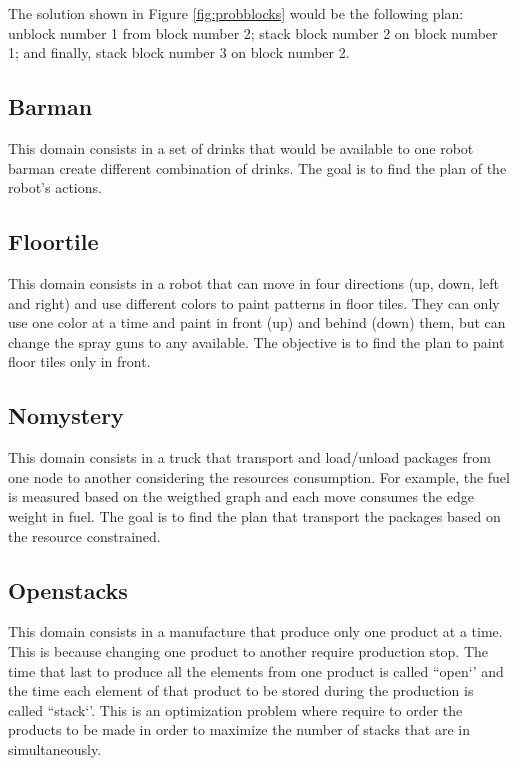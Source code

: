 The solution shown in Figure \ref{fig:probblocks} would be the following plan: unblock number 1 from block number 2; stack block number 2 on block number 1; and finally, stack block number 3 on block number 2.

\subsection{Barman}
This domain consists in a set of drinks that would be available to one robot barman create different combination of drinks. The goal is to find the plan of the robot's actions.

\subsection{Floortile}
This domain consists in a robot that can move in four directions (up, down, left and right) and use different colors to paint patterns in floor tiles. They can only use one color at a time and paint in front (up) and behind (down) them, but can change the spray guns to any available. The objective is to find the plan to paint floor tiles only in front.%

\subsection{Nomystery}
This domain consists in a truck that transport and load/unload packages from one node to another considering the resources consumption. For example, the fuel is measured based on the weigthed graph and each move consumes the edge weight in fuel. The goal is to find the plan that transport the packages based on the resource constrained.

\subsection{Openstacks}
This domain consists in a manufacture that produce only one product at a time. This is because changing one product to another require production stop. The time that last to produce all the elements from one product is called ``open‘’ and the time each element of that product to be stored during the production is called ``stack‘’. This is an optimization problem where require to order the products to be made in order to maximize the number of stacks that are in simultaneously.

